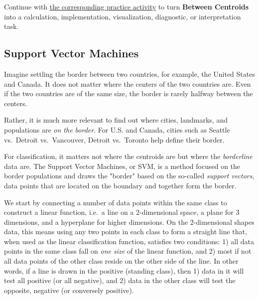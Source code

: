 \documentclass[
  letterpaper,
]{scrbook}
\begin{document}
\begin{tcolorbox}[enhanced jigsaw, arc=.35mm, bottomrule=.15mm, bottomtitle=1mm, breakable, colback=white, colbacktitle=quarto-callout-tip-color!10!white, colframe=quarto-callout-tip-color-frame, coltitle=black, left=2mm, leftrule=.75mm, opacityback=0, opacitybacktitle=0.6, rightrule=.15mm, title=\textcolor{quarto-callout-tip-color}{\faLightbulb}\hspace{0.5em}{Put it into practice}, titlerule=0mm, toprule=.15mm, toptitle=1mm]

Continue with \hyperref[sec-pr-07-between-centroids]{the corresponding
practice activity} to turn \textbf{Between Centroids} into a
calculation, implementation, visualization, diagnostic, or
interpretation task.

\end{tcolorbox}

\subsection{Support Vector Machines}\label{support-vector-machines}

Imagine settling the border between two countries, for example, the
United States and Canada. It does not matter where the centers of the
two countries are. Even if the two countries are of the same size, the
border is rarely halfway between the centers.

Rather, it is much more relevant to find out where cities, landmarks,
and populations are \emph{on the border}. For U.S. and Canada, cities
such as Seattle vs.~Detroit vs.~Vancouver, Detroit vs.~Toronto help
define their border.

For classification, it matters not where the centroids are but where the
\emph{borderline} data are. The Support Vector Machines, or SVM, is a
method focused on the border populations and draws the "border" based on
the so-called \emph{support vectors}, data points that are located on
the boundary and together form the border.

We start by connecting a number of data points within the same class to
construct a linear function, i.e.~a line on a 2-dimensional space, a
plane for 3 dimensions, and a hyperplane for higher dimensions. On the
2-dimensional shapes data, this means using any two points in each class
to form a straight line that, when used as the linear classification
function, satisfies two conditions: 1) all data points in the same class
fall on \emph{one size} of the linear function, and 2) most if not all
data points of the other class reside on the other side of the line. In
other words, if a line is drawn in the positive (standing class), then
1) data in it will test all positive (or all negative), and 2) data in
the other class will test the opposite, negative (or conversely
positive).
\end{document}
